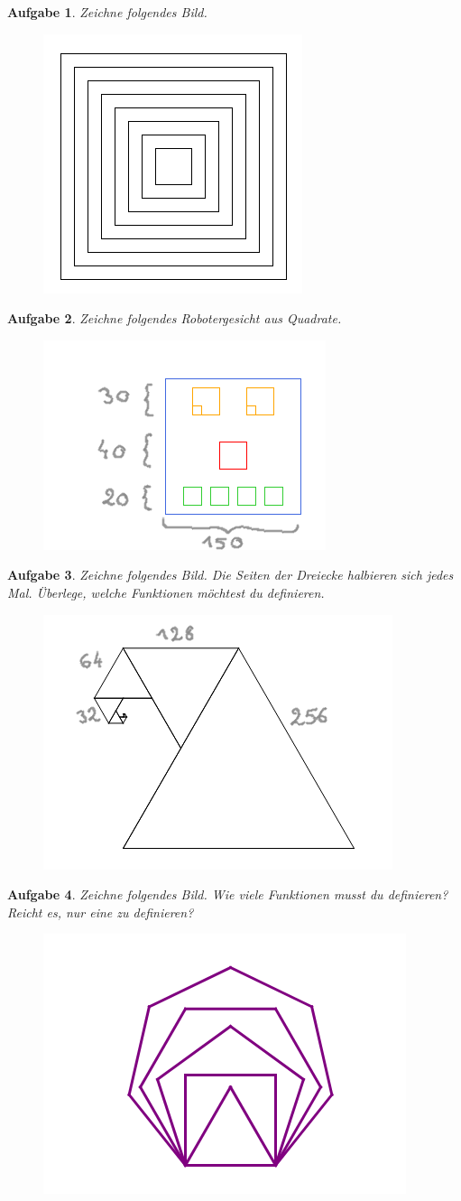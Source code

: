 \documentclass{article}
\newtheorem{aufgabe}{Aufgabe}[section]
\begin{document}
\begin{aufgabe} \label{aufgabe-spiegel-korridor}
Zeichne folgendes Bild.
\begin{figure}[H]
\centering
\includegraphics[width=0.2\linewidth]{pictures/picture-spiegel-korridor.png}
\end{figure}
\end{aufgabe}

\begin{aufgabe} \label{aufgabe-roboter-gesicht}
Zeichne folgendes Robotergesicht aus Quadrate.
\begin{figure}[H]
\centering
\includegraphics[width=0.25\linewidth]{pictures/picture-roboter-gesicht.png}
\end{figure}
\end{aufgabe}

\begin{aufgabe} \label{aufgabe-halbe-dreiecke}
Zeichne folgendes Bild. Die Seiten der Dreiecke halbieren sich jedes Mal. Überlege, welche Funktionen möchtest du definieren.
\begin{figure}[H]
\centering
\includegraphics[width=0.3\linewidth]{pictures/picture-halbe-dreiecke.png}
\end{figure}
\end{aufgabe}

\begin{aufgabe} \label{aufgabe-polygone}
Zeichne folgendes Bild. Wie viele Funktionen musst du definieren? Reicht es, nur eine zu definieren?
\begin{figure}[H]
\centering
\includegraphics[width=0.35\linewidth]{pictures/picture-polygone.png}
\end{figure}
\end{aufgabe}
\end{document}
